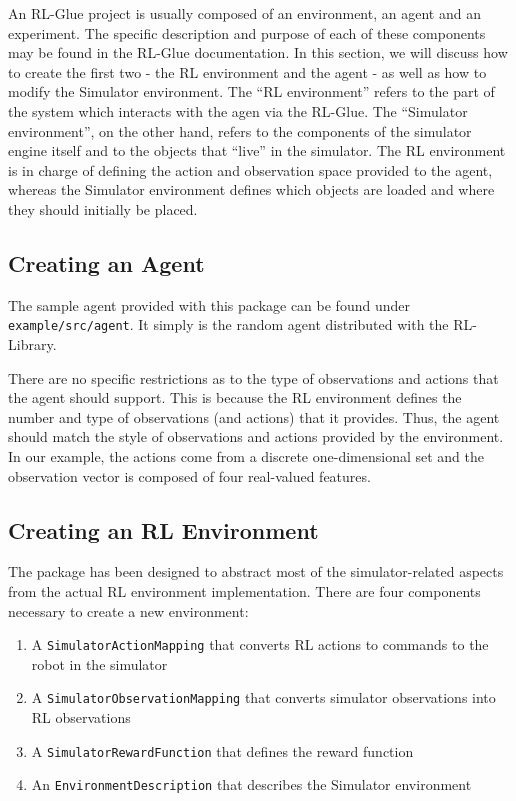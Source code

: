 \documentclass[12pt]{article}
\newcommand{\code}[1]{\texttt{#1}}
\begin{document}
An RL-Glue project is usually composed of an environment, an agent and
an experiment. The specific description and purpose of each of these 
components may be found in the RL-Glue documentation. In this section, we
will discuss how to create the first two - the RL environment and the agent -
as well as how to modify the Simulator environment. The ``RL environment''
refers to the part of the system which interacts with the agen via the RL-Glue.
The ``Simulator environment'', on the other hand, refers to the components
of the simulator engine itself and to the objects that ``live'' in the
simulator. The RL environment is in charge of defining the action and 
observation space provided to the agent, whereas the Simulator environment
defines which objects are loaded and where they should initially be placed.

\subsection{Creating an Agent}

The sample agent provided with this package can be found under
\code{example/src/agent}. It simply is the random agent distributed with the 
RL-Library.

There are no specific restrictions as to the type of observations and 
actions that the agent should support. This is because the RL environment
defines the number and type of observations (and actions) that it provides.
Thus, the agent should match the style of observations and actions provided
by the environment. In our example, the actions come from a discrete 
one-dimensional set and the observation vector is composed of four real-valued 
features.

\subsection{Creating an RL Environment}

The package has been designed to abstract most of the simulator-related
aspects from the actual RL environment implementation. There are four 
components necessary to create a new environment:

\begin{enumerate}
\item{A \code{SimulatorActionMapping} that converts RL actions to commands to the robot in the simulator}
\item{A \code{SimulatorObservationMapping} that converts simulator observations into RL observations}
\item{A \code{SimulatorRewardFunction} that defines the reward function}
\item{An \code{EnvironmentDescription} that describes the Simulator environment}
\end{enumerate}
\end{document}

